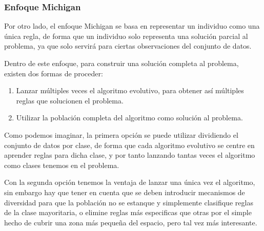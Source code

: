 \subsubsection{Enfoque Michigan}

Por otro lado, el enfoque Michigan se basa en representar un individuo como una única regla, de forma que un individuo solo representa una solución parcial al problema, ya que solo servirá para ciertas observaciones del conjunto de datos.

Dentro de este enfoque, para construir una solución completa al problema, existen dos formas de proceder:

\begin{enumerate}
	\item Lanzar múltiples veces el algoritmo evolutivo, para obtener así múltiples reglas que solucionen el problema.
	\item Utilizar la población completa del algoritmo como solución al problema.
\end{enumerate}

Como podemos imaginar, la primera opción se puede utilizar dividiendo el conjunto de datos por clase, de forma que cada algoritmo evolutivo se centre en aprender reglas para dicha clase, y por tanto lanzando tantas veces el algoritmo como clases tenemos en el problema.

Con la segunda opción tenemos la ventaja de lanzar una única vez el algoritmo, sin embargo hay que tener en cuenta que se deben introducir mecanismos de diversidad para que la población no se estanque y simplemente clasifique reglas de la clase mayoritaria, o elimine reglas más especificas que otras por el simple hecho de cubrir una zona más pequeña del espacio, pero tal vez más interesante.



\newpage
